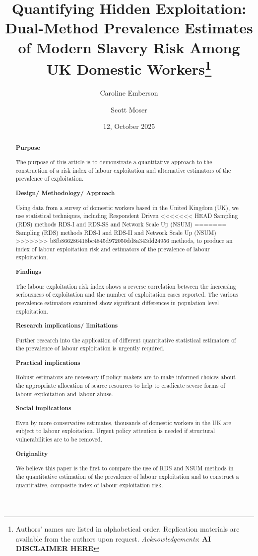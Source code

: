 \documentclass[
  12pt,
  letterpaper,
  DIV=11,
  numbers=noendperiod]{scrartcl}
\title{Quantifying Hidden Exploitation: Dual-Method Prevalence Estimates
of Modern Slavery Risk Among UK Domestic Workers\footnote{Authors' names
  are listed in alphabetical order. Replication materials are available
  from the authors upon request. \emph{Acknowledgements}: \textbf{AI
  DISCLAIMER HERE}}}
\author{Caroline Emberson \and Scott Moser}
\date{12, October 2025}
\theoremstyle{plain}
\theoremstyle{definition}
\begin{document}
\maketitle
\begin{abstract}
\textbf{Purpose}

The purpose of this article is to demonstrate a quantitative approach to
the construction of a risk index of labour exploitation and alternative
estimators of the prevalence of exploitation.

\textbf{Design/ Methodology/ Approach}

Using data from a survey of domestic workers based in the United Kingdom
(UK), we use statistical techniques, including Respondent Driven
<<<<<<< HEAD
Sampling (RDS) methods RDS-I and RDS-SS and Network Scale Up (NSUM)
=======
Sampling (RDS) methods RDS-I and RDS-II and Network Scale Up (NSUM)
>>>>>>> b8fb866286418bc4845d972050dd8a343dd24956
methods, to produce an index of labour exploitation risk and estimators
of the prevalence of labour exploitation.

\textbf{Findings}

The labour exploitation risk index shows a reverse correlation between
the increasing seriousness of exploitation and the number of
exploitation cases reported. The various prevalence estimators examined
show significant differences in population level exploitation.

\textbf{Research implications/ limitations}

Further research into the application of different quantitative
statistical estimators of the prevalence of labour exploitation is
urgently required.

\textbf{Practical implications}

Robust estimators are necessary if policy makers are to make informed
choices about the appropriate allocation of scarce resources to help to
eradicate severe forms of labour exploitation and labour abuse.

\textbf{Social implications}

Even by more conservative estimates, thousands of domestic workers in
the UK are subject to labour exploitation. Urgent policy attention is
needed if structural vulnerabilities are to be removed.

\textbf{Originality}

We believe this paper is the first to compare the use of RDS and NSUM
methods in the quantitative estimation of the prevalence of labour
exploitation and to construct a quantitative, composite index of labour
exploitation risk.
\end{abstract}
\end{document}
